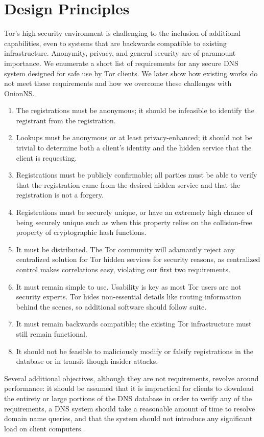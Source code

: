 \section{Design Principles}

Tor's high security environment is challenging to the inclusion of additional capabilities, even to systems that are backwards compatible to existing infrastructure. Anonymity, privacy, and general security are of paramount importance. We enumerate a short list of requirements for any secure DNS system designed for safe use by Tor clients. We later show how existing works do not meet these requirements and how we overcome these challenges with OnionNS.

\begin{enumerate}
	\item The registrations must be anonymous; it should be infeasible to identify the registrant from the registration.
	\item Lookups must be anonymous or at least privacy-enhanced; it should not be trivial to determine both a client's identity and the hidden service that the client is requesting.
	\item Registrations must be publicly confirmable; all parties must be able to verify that the registration came from the desired hidden service and that the registration is not a forgery. %
	\item Registrations must be securely unique, or have an extremely high chance of being securely unique such as when this property relies on the collision-free property of cryptographic hash functions.
	\item It must be distributed. The Tor community will adamantly reject any centralized solution for Tor hidden services for security reasons, as centralized control makes correlations easy, violating our first two requirements.
	\item It must remain simple to use. Usability is key as most Tor users are not security experts. Tor hides non-essential details like routing information behind the scenes, so additional software should follow suite. %
	\item It must remain backwards compatible; the existing Tor infrastructure must still remain functional.
	\item It should not be feasible to maliciously modify or falsify registrations in the database or in transit though insider attacks.
\end{enumerate}

Several additional objectives, although they are not requirements, revolve around performance: it should be assumed that it is impractical for clients to download the entirety or large portions of the DNS database in order to verify any of the requirements, a DNS system should take a reasonable amount of time to resolve domain name queries, and that the system should not introduce any significant load on client computers.
